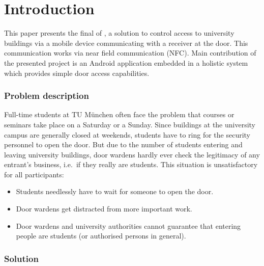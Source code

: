 \bigskip
\bigskip


\section{Introduction}

This paper presents the final of \app, a solution to control access to university buildings via a mobile device communicating with a receiver at the door.
This communication works via near field communication (NFC).
Main contribution of the presented project is an Android application embedded in a holistic system which provides simple door access capabilities.




\subsubsection*{Problem description}


Full-time students at TU München often face the problem that courses or seminars take place on a Saturday or a Sunday.
Since buildings at the university campus are generally closed at weekends, students have to ring for the security personnel to open the door.
But due to the number of students entering and leaving university buildings, door wardens hardly ever check the legitimacy of any entrant's business, i.e.~if they really are students.
This situation is unsatisfactory for all participants:

\begin{itemize}
\item Students needlessly have to wait for someone to open the door.
\item Door wardens get distracted from more important work.
\item Door wardens and university authorities cannot guarantee that entering people are students (or authorised persons in general).
\end{itemize}

\subsubsection*{Solution}

